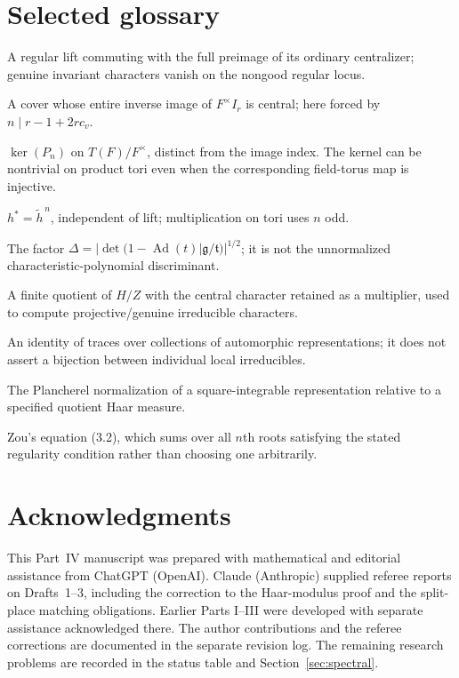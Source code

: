 \documentclass[11pt]{article}
\theoremstyle{plain}
\theoremstyle{definition}
\begin{document}
\section{Selected glossary}\label{sec:glossary}
\begin{description}[style=nextline,leftmargin=3.0cm]
\item[Good element] A regular lift commuting with the full preimage of its ordinary centralizer; genuine invariant characters vanish on the nongood regular locus.
\item[Scalar-central cover] A cover whose entire inverse image of $F^\times I_r$ is central; here forced by $n\mid r-1+2rc_v$.
\item[Power-map kernel] $\ker(P_n)$ on $T(F)/F^\times$, distinct from the image index.  The kernel can be nontrivial on product tori even when the corresponding field-torus map is injective.
\item[Star map] $h^*=\widetilde h^{\,n}$, independent of lift; multiplication on tori uses $n$ odd.
\item[Weyl discriminant] The factor $\Delta=|\det(1-\operatorname{Ad}(t)|\mathfrak g/\mathfrak t)|^{1/2}$; it is not the unnormalized characteristic-polynomial discriminant.
\item[Twisted finite quotient] A finite quotient of $H/Z$ with the central character retained as a multiplier, used to compute projective/genuine irreducible characters.
\item[Packet identity] An identity of traces over collections of automorphic representations; it does not assert a bijection between individual local irreducibles.
\item[Formal degree] The Plancherel normalization of a square-integrable representation relative to a specified quotient Haar measure.
\item[Root-sum relation] Zou's equation (3.2), which sums over all $n$th roots satisfying the stated regularity condition rather than choosing one arbitrarily.
\end{description}

\section*{Acknowledgments}
This Part~IV manuscript was prepared with mathematical and editorial
assistance from ChatGPT (OpenAI).  Claude (Anthropic) supplied
referee reports on Drafts~1--3, including the correction to the
Haar-modulus proof and the split-place matching obligations.  Earlier Parts I--III were developed
with separate assistance acknowledged there.  The author contributions and the referee corrections are documented
in the separate revision log.  The remaining research problems are
recorded in the status table and Section~\ref{sec:spectral}.
\end{document}
